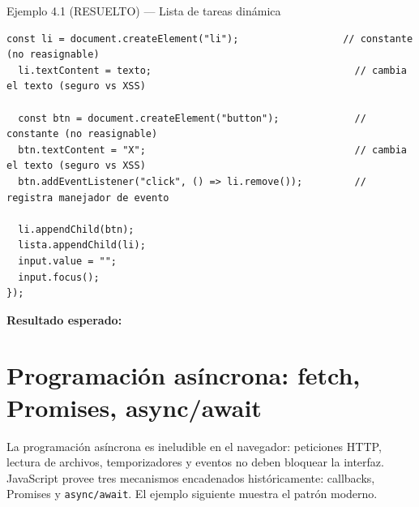 \begin{cajaejemplo}{Ejemplo 4.1 (RESUELTO) --- Lista de tareas dinámica}
\begin{lstlisting}[style=js,caption={tareas.js},label=lst:4.5]
  const li = document.createElement("li");                  // constante (no reasignable)
  li.textContent = texto;                                   // cambia el texto (seguro vs XSS)

  const btn = document.createElement("button");             // constante (no reasignable)
  btn.textContent = "X";                                    // cambia el texto (seguro vs XSS)
  btn.addEventListener("click", () => li.remove());         // registra manejador de evento

  li.appendChild(btn);
  lista.appendChild(li);
  input.value = "";
  input.focus();
});
\end{lstlisting}

\textbf{Resultado esperado:}

\end{cajaejemplo}

\section{Programación asíncrona: fetch, Promises, async/await}

La programación asíncrona es ineludible en el navegador:
peticiones HTTP, lectura de archivos, temporizadores y eventos no
deben bloquear la interfaz. JavaScript provee tres mecanismos
encadenados históricamente: callbacks, Promises y \texttt{async/await}.
El ejemplo siguiente muestra el patrón moderno.


